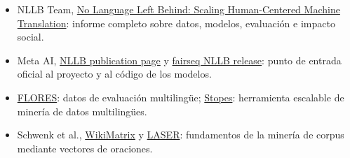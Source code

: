 \documentclass[a4paper]{article}
\begin{document}
\begingroup
\scriptsize
\begin{itemize}[itemsep=0pt,topsep=0.15em,parsep=0pt]
  \item NLLB Team, \href{https://arxiv.org/abs/2207.04672}{No Language Left Behind: Scaling Human-Centered Machine Translation}: informe completo sobre datos, modelos, evaluación e impacto social.
  \item Meta AI, \href{https://research.facebook.com/publications/no-language-left-behind/}{NLLB publication page} y \href{https://github.com/facebookresearch/fairseq/tree/nllb}{fairseq NLLB release}: punto de entrada oficial al proyecto y al código de los modelos.
  \item \href{https://github.com/facebookresearch/flores}{FLORES}: datos de evaluación multilingüe; \href{https://github.com/facebookresearch/stopes}{Stopes}: herramienta escalable de minería de datos multilingües.
  \item Schwenk et al., \href{https://arxiv.org/abs/1907.05791}{WikiMatrix} y \href{https://github.com/facebookresearch/LASER}{LASER}: fundamentos de la minería de corpus mediante vectores de oraciones.
\end{itemize}
\endgroup
\end{document}
